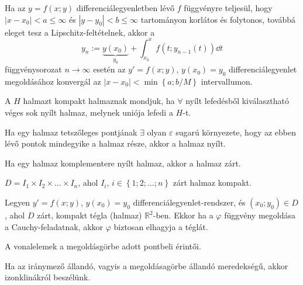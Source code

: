 \begin{theorem}
  Ha az $y = f(x; y)$ differenciálegyenletben lévő $f$ függvényre teljesül, hogy
  $\left| x - x_0 \right| < a \leq \infty$ és $\left| y - y_0 \right| < b \leq
    \infty$ tartományon korlátos és folytonos, továbbá eleget tesz a
  Lipschitz-feltételnek, akkor a
  \begin{equation*}
    y_n
    := \underbrace{y(x_0)}_{y_0}
    + \int_{x_0}^x f\left(
    t; y_{n-1}(t)
    \right) \dd t
  \end{equation*}
  függvénysorozat $n \rightarrow \infty$ esetén az $y' = f(x; y)$, $y(x_0) =
    y_0$ differenciálegyenlet megoldásához konvergál az  $\left| x - x_0 \right|
    < \min \left\{ a; b/M \right\}$  intervallumon.
\end{theorem}

\begin{definition}
  A $H$ halmazt kompakt halmaznak mondjuk, ha $\forall$ nyílt lefedésből
  kiválasztható véges sok nyílt halmaz, melynek uniója lefedi a $H$-t.
\end{definition}

\begin{definition}
  Ha egy halmaz tetszőleges pontjának $\exists$ olyan $\varepsilon$ sugarú
  környezete, hogy az ebben lévő pontok mindegyike a halmaz része, akkor a
  halmaz nyílt.
\end{definition}

\begin{definition}
  Ha egy halmaz komplementere nyílt halmaz, akkor a halmaz zárt.
\end{definition}

\begin{statement}
  $D = I_1 \times I_2 \times \dots \times I_n$, ahol
  $I_i$, $i \in \left\{1;2;\dots;n\right\}$ zárt halmaz kompakt.
\end{statement}

\begin{theorem}
  Legyen $y' = f(x; y)$, $y(x_0) = y_0$ differenciálegyenlet-rendszer, és
  $\left( x_0; y_0 \right) \in D$, ahol $D$ zárt, kompakt tégla (halmaz)
  $\mathbb{R}^2$-ben. Ekkor ha a $\varphi$ függvény megoldása a
  Cauchy-feladatnak, akkor $\varphi$ biztosan elhagyja a téglát.
\end{theorem}

\begin{definition}
  A vonalelemek a megoldásgörbe adott pontbeli érintői.

  Ha az iránymező állandó, vagyis a megoldásagörbe állandó meredekségű, akkor
  izonklinákról beszélünk.
\end{definition}